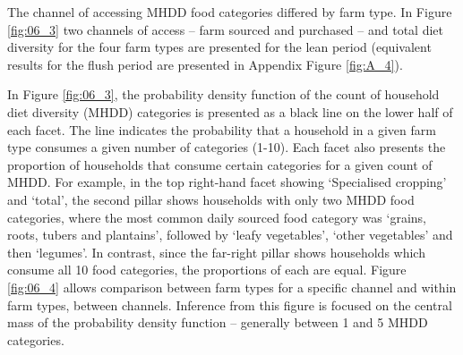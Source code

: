 \vspace{-0.5cm}

The channel of accessing MHDD food categories differed by farm type. In Figure \ref{fig:06_3} two channels of access -- farm sourced and purchased -- and total diet diversity for the four farm types are presented for the lean period (equivalent results for the flush period are presented in Appendix Figure \ref{fig:A_4}).

In Figure \ref{fig:06_3}, the probability density function of the count of household diet diversity (MHDD) categories is presented as a black line on the lower half of each facet. The line indicates the probability that a household in a given farm type consumes a given number of categories (1-10). Each facet also presents the proportion of households that consume certain categories for a given count of MHDD. For example, in the top right-hand facet showing `Specialised cropping' and `total', the second pillar shows households with only two MHDD food categories, where the most common daily sourced food category was `grains, roots, tubers and plantains', followed by `leafy vegetables', `other vegetables' and then `legumes'. In contrast, since the far-right pillar shows households which consume all 10 food categories, the proportions of each are equal. {Figure \ref{fig:06_4}} allows comparison between farm types for a specific channel and within farm types, between channels. Inference from this figure is focused on the central mass of the probability density function -- generally between 1 and 5 MHDD categories.

